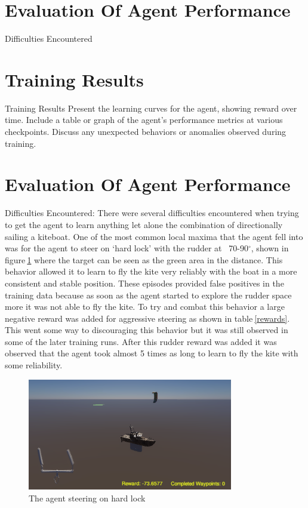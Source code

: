 \section{Evaluation Of Agent Performance}

Difficulties Encountered

\section{Training Results}
Training Results
Present the learning curves for the agent, showing reward over time.
Include a table or graph of the agent’s performance metrics at various checkpoints.
Discuss any unexpected behaviors or anomalies observed during training.

\section{Evaluation Of Agent Performance}

Difficulties Encountered:
There were several difficulties encountered when trying to get the agent to learn anything let alone the combination of directionally sailing a kiteboat. One of the most common local maxima that the agent fell into was for the agent to steer on `hard lock' with the rudder at ~70-90$^{\circ}$, shown in figure$~$\ref{hard_lock} where the target can be seen as the green area in the distance. This behavior allowed it to learn to fly the kite very reliably with the boat in a more consistent and stable position. These episodes provided false positives in the training data because as soon as the agent started to explore the rudder space more it was not able to fly the kite. To try and combat this behavior a large negative reward was added for aggressive steering as shown in table$~$\ref{rewards}. This went some way to discouraging this behavior but it was still observed in some of the later training runs. After this rudder reward was added it was observed that the agent took almost 5 times as long to learn to fly the kite with some reliability. 

\begin{figure}[!htb]
    \centering
    \includegraphics[width=0.8\textwidth]{Images/hard_lock.png}
    \caption{The agent steering on hard lock}
    \label{hard_lock}
\end{figure}


